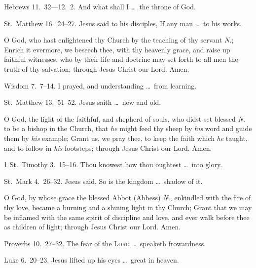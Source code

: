  Hebrews 11.~32—12.~2.   And what shall I \ldots\ the throne of God.

 St.~Matthew 16.~24–27.   Jesus said to his disciples, If any man \ldots\ to his works.

\medskip


 O God, who hast enlightened thy Church by the teaching of thy servant \emph{N.}; Enrich it evermore, we beseech thee, with thy heavenly grace, and raise up faithful witnesses, who by their life and doctrine may set forth to all men the truth of thy salvation; through Jesus Christ our Lord. \R Amen.

 Wisdom 7.~7–14.   I prayed, and understanding \ldots\ from learning.

 St.~Matthew 13.~51–52.   Jesus saith \ldots\ new and old.

\medskip


 O God, the light of the faithful, and shepherd of souls, who didst set blessed \emph{N.} to be a bishop in the Church, that \emph{he} might feed thy sheep by \emph{his} word and guide them by \emph{his} example; Grant us, we pray thee, to keep the faith which \emph{he} taught, and to follow in \emph{his} footsteps; through Jesus Christ our Lord. \R Amen.

 1 St.~Timothy 3.~15–16.   Thou knowest how thou oughtest \ldots\ into glory.

 St.~Mark 4.~26–32.   Jesus said, So is the kingdom \ldots\ shadow of it.
 
\medskip


 O God, by whose grace the blessed Abbot (Abbess) \emph{N.}, enkindled with the fire of thy love, became a burning and a shining light in thy Church; Grant that we may be inflamed with the same spirit of discipline and love, and ever walk before thee as children of light; through Jesus Christ our Lord. \R Amen.

 Proverbs 10.~27–32.   The fear of the {\scshape Lord} \ldots\ speaketh frowardness.

 Luke 6.~20–23.   Jesus lifted up his eyes \ldots\ great in heaven.

\medskip

